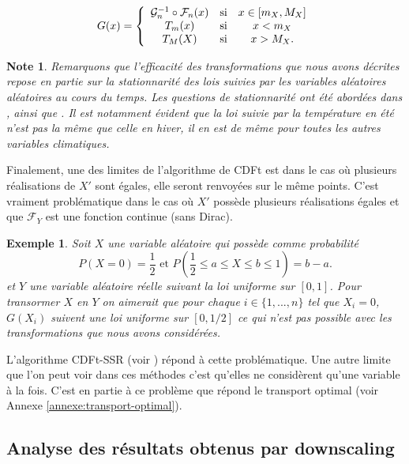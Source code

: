 \documentclass[a4paper,11pt]{article}
\numberwithin{equation}{section}
\newtheorem{example}{Exemple}
\newtheorem{note}{Note}
\begin{document}
\begin{equation}
	G(x)=
	\left\lbrace
	\begin{array}{ccc}
		\mathcal{G}_n^{-1}\circ \mathcal{F}_n(x) & \hbox{si}& x\in [m_X,M_X]\\
		T_m(x) & \hbox{si} & x<m_X\\
		T_M(X) & \hbox{si} & x>M_X.
	\end{array}\right.
\end{equation}


\begin{note}
	Remarquons que l'efficacité des transformations que nous avons décrites repose en partie sur la stationnarité des lois suivies par les variables aléatoires aléatoires au cours du temps. Les questions de stationnarité ont été abordées dans \cite{maraun2012nonstationarities}, \cite{christensen2008need} ainsi que \cite{nahar2017assessing}. Il est notamment évident que la loi suivie par la température en été n'est pas la même que celle en hiver, il en est de même pour toutes les autres variables climatiques.
\end{note}

Finalement, une des limites de l'algorithme de CDFt est dans le cas où plusieurs réalisations de $X'$ sont égales, elle seront renvoyées sur le même points. C'est vraiment problématique dans le cas où $X'$ possède plusieurs réalisations égales et que $\mathcal{F}_Y$ est une fonction continue (sans Dirac).

\begin{example}
	Soit $X$ une variable aléatoire qui possède comme probabilité 
	\[P(X=0)=\frac{1}{2} \textrm{ et } P( \frac{1}{2}\leq a\leq X \leq b\leq 1 )=b-a.\]
	et $Y$ une variable aléatoire réelle suivant la loi uniforme sur $[0,1]$. Pour transormer $X$ en $Y$ on aimerait que pour chaque $i\in \{1,...,n\}$ tel que $X_i=0$, $G(X_i)$ suivent une loi uniforme sur $[0,1/2]$ ce qui n'est pas possible avec les transformations que nous avons considérées.
\end{example}  

L'algorithme CDFt-SSR (voir \cite{vrac2012dynamical}) répond à cette problématique. Une autre limite que l'on peut voir dans ces méthodes c'est qu'elles ne considèrent qu'une variable à la fois. C'est en partie à ce problème que répond le transport optimal (voir Annexe \ref{annexe:transport-optimal}). 


\subsection{Analyse des résultats obtenus par downscaling}
\label{analyse-pred}
\end{document}
